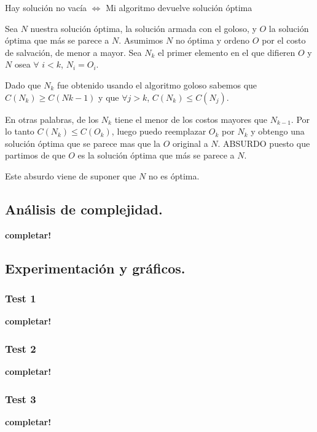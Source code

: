 Hay solución no vacía $\Longleftrightarrow$ Mi algoritmo devuelve solución óptima

Sea $N$ nuestra solución óptima, la solución armada con el goloso, y $O$ la solución óptima que más se parece a $N$. Asumimos $N$ no óptima y ordeno $O$ por el costo de salvación, de menor a mayor.
Sea $N_{k}$ el primer elemento en el que difieren $O$ y $N$ osea $\forall$ $i<k$, $N_{i}=O_{i}$.

Dado que $N_{k}$ fue obtenido usando el algoritmo goloso sabemos que $C(N_{k}) \geq C(N{k-1})$ y que $\forall j>k$, $C(N_{k})\leq C(N_{j})$.

En otras palabras, de los $N_{k}$ tiene el menor de los costos mayores que $N_{k-1}$. Por lo tanto $C(N_{k})\leq C(O_{k})$, luego puedo reemplazar $O_{k}$ por $N_{k}$ y obtengo una solución óptima que se parece mas que la $O$ original a $N$. ABSURDO puesto que partimos de que $O$ es la solución óptima que más se parece a $N$.

Este absurdo viene de suponer que $N$ no es óptima.





\newpage
\subsection{Análisis de complejidad.}

\vspace*{0.3cm}

\textbf{completar!}



\newpage
\subsection{Experimentación y gráficos.}

\vspace*{0.3cm}

\subsubsection{Test 1}

\vspace*{0.3cm}

\textbf{completar!}


\newpage
\subsubsection{Test 2}

\vspace*{0.3cm}

\textbf{completar!}


\newpage
\subsubsection{Test 3}

\vspace*{0.3cm}

\textbf{completar!}

